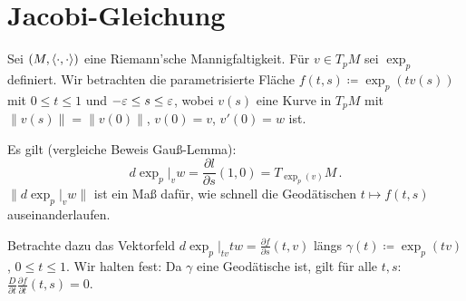 \documentclass[a4paper,twoside,DIV15,BCOR12mm]{scrbook}
\renewcommand{\da}{\coloneqq}
\begin{document}
\section{Jacobi-Gleichung}

Sei $(M,\langle\cdot,\cdot\rangle)$ eine Riemann’sche Mannigfaltigkeit. Für $v\in T_pM$ sei $\exp_p$ definiert. Wir betrachten die parametrisierte Fläche $f(t,s) \da \exp_p(t v(s))$ mit $0\le t \le 1$ und $-\varepsilon \le s \le \varepsilon$, wobei $v(s)$ eine Kurve in $T_pM$ mit $\|v(s)\| = \|v(0)\|$, $v(0) = v$, $v'(0) = w$ ist.

Es gilt (vergleiche Beweis Gauß-Lemma):
\[
d\exp_p|_v w  = \frac{\partial l}{\partial s}(1,0) = T_{\exp_p(v)}M\,.
\] $\|d\exp_p|_v w\|$ ist ein Maß dafür, wie schnell die Geodätischen $t\mapsto f(t,s)$ auseinanderlaufen.


Betrachte dazu das Vektorfeld $d\exp_p|_{tv} tw = \frac{\partial f}{\partial s}(t,v)$ längs $\gamma(t) \da \exp_p(tv)$, $0\le t\le 1$. Wir halten fest: Da $\gamma$ eine Geodätische ist, gilt für alle $t,s$: $\frac D{\partial t}\frac{\partial f}{\partial t}(t,s)=0$.
\end{document}

